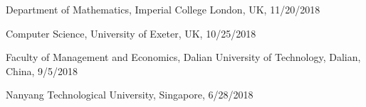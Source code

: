 \documentclass[11pt,letter]{article}
\renewenvironment{itemize}{
  \begin{list}{}{
    \setlength{\leftmargin}{1.5em}
    \setlength{\itemsep}{0.25em}
    \setlength{\parskip}{0pt}
    \setlength{\parsep}{0.25em}
  }
}{
  \end{list}
}
\begin{document}
\begin{itemize}

\item
Department of Mathematics, Imperial College London, UK, 11/20/2018

\item
Computer Science,
University of Exeter, UK, 10/25/2018


Faculty of Management and Economics, Dalian University of Technology, Dalian, China, 9/5/2018



Nanyang Technological University, Singapore, 6/28/2018





\end{itemize}
\end{document}
